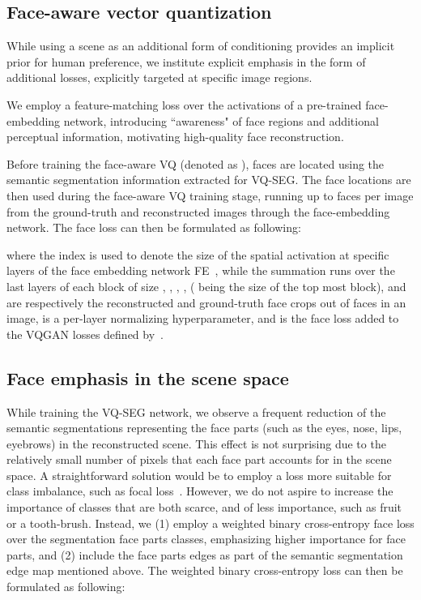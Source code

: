\documentclass[final]{cvpr}
\begin{document}
\subsection{Face-aware vector quantization} 
While using a scene as an additional form of conditioning provides an implicit prior for human preference, we institute explicit emphasis in the form of additional losses, explicitly targeted at specific image regions. 

We employ a feature-matching loss over the activations of a pre-trained face-embedding network, introducing ``awareness" of face regions and additional perceptual information, motivating high-quality face reconstruction. 

Before training the face-aware VQ (denoted as ), faces are located using the semantic segmentation information extracted for VQ-SEG. The face locations are then used during the face-aware VQ training stage, running up to  faces per image from the ground-truth and reconstructed images through the face-embedding network. The face loss can then be formulated as following:


where the index  is used to denote the size of the spatial activation at specific layers of the face embedding network FE~\cite{vggface2}, while the summation runs over the last layers of each block of size , , , ,  ( being the size of the top most block),  and  are respectively the reconstructed and ground-truth face crops  out of  faces in an image,  is a per-layer normalizing hyperparameter, and  is the face loss added to the VQGAN losses defined by~\cite{esser2021taming}.

\subsection{Face emphasis in the scene space}
While training the VQ-SEG network, we observe a frequent reduction of the semantic segmentations representing the face parts (such as the eyes, nose, lips, eyebrows) in the reconstructed scene. This effect is not surprising due to the relatively small number of pixels that each face part accounts for in the scene space. A straightforward solution would be to employ a loss more suitable for class imbalance, such as focal loss~\cite{lin2017focal}. However, we do not aspire to increase the importance of classes that are both scarce, and of less importance, such as fruit or a tooth-brush. 
Instead, we (1) employ a weighted binary cross-entropy face loss over the segmentation face parts classes, emphasizing higher importance for face parts, and (2) include the face parts edges as part of the semantic segmentation edge map mentioned above.
The weighted binary cross-entropy loss can then be formulated as following:
\end{document}
